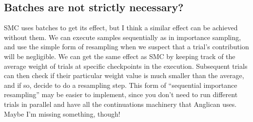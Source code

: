 \documentclass[a4paper, 11pt]{article}
\theoremstyle{definition}
\begin{document}
\subsection*{Batches are not strictly necessary?}

SMC uses batches to get its effect, but I think a similar effect can be achieved without them. We can execute samples sequentially as in importance sampling, and use the simple form of resampling when we suspect that a trial's contribution will be negligible. We can get the same effect as SMC by keeping track of the average weight of trials at specific checkpoints in the execution. Subsequent trials can then check if their particular weight value is much smaller than the average, and if so, decide to do a resampling step. This form of ``sequential importance resampling'' may be easier to implement, since you don't need to run different trials in parallel and have all the continuations machinery that Anglican uses. Maybe I'm missing something, though!



\end{document}
